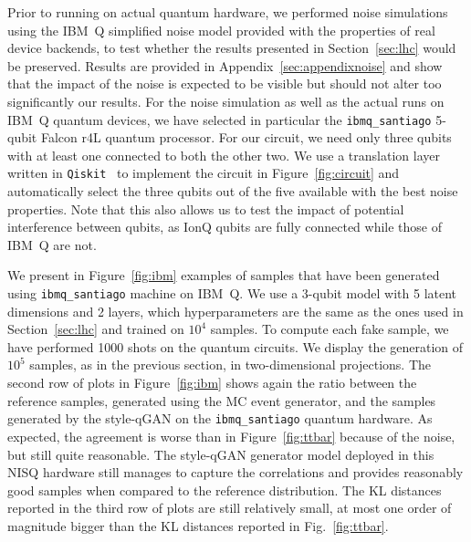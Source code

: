 \documentclass[twocolumn,preprintnumbers,superscriptaddress]{revtex4-2}
\begin{document}
 Prior to running on actual quantum hardware, we performed noise simulations using the
IBM~Q simplified noise model provided with the properties of real device backends, to test whether the results presented in Section~\ref{sec:lhc} would be preserved. Results are provided in Appendix~\ref{sec:appendixnoise} and show that the impact of the noise is expected to be visible but should not alter too significantly our
results. For the noise simulation as well as the actual runs on IBM~Q quantum devices,
we have selected in particular the {\tt ibmq\_santiago} 5-qubit Falcon r4L quantum processor. For our circuit, we need only three qubits with at least one connected to both the other two. We use a translation layer written in \texttt{Qiskit}~\cite{gadi_aleksandrowicz_2019_2562111} to implement the circuit in Figure~\ref{fig:circuit} and automatically select the three qubits out of the five available
with the best noise properties. Note that this also allows us to test the impact of potential
interference between qubits, as IonQ qubits are fully connected while those of IBM~Q are not.

We present in Figure~\ref{fig:ibm} examples of samples that have been
generated using {\tt ibmq\_santiago} machine on IBM~Q. We use a 3-qubit
model with 5 latent dimensions and 2 layers, which hyperparameters are
the same as the ones used in Section~\ref{sec:lhc} and trained on
$10^4_{}$ samples. To compute each fake sample, we have performed 1000 shots on the
quantum circuits. We display the generation of $10^5$ samples, as in the previous section,
in two-dimensional projections. The second row of plots in
Figure~\ref{fig:ibm} shows again the ratio between the reference
samples, generated using the MC event generator, and the samples
generated by the style-qGAN on the {\tt ibmq\_santiago} quantum
hardware. As expected, the agreement is worse than in
Figure~\ref{fig:ttbar} because of the noise, but still quite
reasonable. The
style-qGAN generator model deployed in this NISQ hardware still
manages to capture the correlations and provides reasonably good
samples when compared to the reference distribution.
The  KL distances reported in the third row of plots are still relatively small, at most one
  order of magnitude bigger than the KL distances reported in Fig.~\ref{fig:ttbar}.
\end{document}
